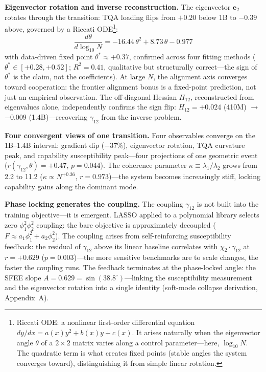 \documentclass[11pt]{article}
\begin{document}
\textbf{Eigenvector rotation and inverse reconstruction.}
The eigenvector $\mathbf{e}_2$ rotates through the transition: TQA loading flips from $+0.20$ below 1B to $-0.39$ above, governed by a Riccati ODE\footnote{Riccati ODE: a nonlinear first-order differential equation $dy/dx = a(x)y^2 + b(x)y + c(x)$. It arises naturally when the eigenvector angle $\theta$ of a $2{\times}2$ matrix varies along a control parameter---here, $\log_{10}N$. The quadratic term is what creates fixed points (stable angles the system converges toward), distinguishing it from simple linear rotation.}:
\begin{equation}
  \frac{d\theta}{d\log_{10}N} = -16.44\,\theta^2 + 8.73\,\theta - 0.977
\end{equation}
with data-driven fixed point $\theta^* \approx +0.37$, confirmed across four fitting methods ($\theta^* \in [+0.28, +0.52]$; $R^2 = 0.41$, qualitative but structurally correct---the sign of $\theta^*$ is the claim, not the coefficients).
At large $N$, the alignment axis converges toward cooperation: the frontier alignment bonus is a fixed-point prediction, not just an empirical observation.
The off-diagonal Hessian $H_{12}$, reconstructed from eigenvalues alone, independently confirms the sign flip: $H_{12} = +0.024$ (410M) $\to$ $-0.009$ (1.4B)---recovering $\gamma_{12}$ from the inverse problem.

\textbf{Four convergent views of one transition.}
Four observables converge on the 1B--1.4B interval: gradient dip ($-37\%$), eigenvector rotation, TQA curvature peak, and capability susceptibility peak---four projections of one geometric event ($r(\gamma_{12}, \theta) = +0.47$, $p = 0.044$).
The coherence parameter $\kappa \equiv \lambda_1/\lambda_2$ grows from 2.2 to 11.2 ($\kappa \propto N^{+0.36}$, $r=0.973$)---the system becomes increasingly stiff, locking capability gains along the dominant mode.

\textbf{Phase locking generates the coupling.}
The coupling $\gamma_{12}$ is not built into the training objective---it is emergent.
LASSO applied to a polynomial library selects zero $\phi_1^2\phi_2^2$ coupling: the bare objective is approximately decoupled ($F \approx a_1\phi_1^2 + a_2\phi_2^2$).
The coupling arises from self-reinforcing susceptibility feedback: the residual of $\gamma_{12}$ above its linear baseline correlates with $\chi_2 \cdot \gamma_{12}$ at $r = +0.629$ ($p = 0.003$)---the more sensitive benchmarks are to scale changes, the faster the coupling runs.
The feedback terminates at the phase-locked angle: the SFEE slope $A = 0.629 = \sin(38.8^\circ)$---linking the susceptibility measurement and the eigenvector rotation into a single identity (soft-mode collapse derivation, Appendix~A).
\end{document}

